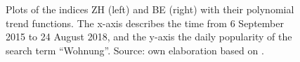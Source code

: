 \documentclass[11pt]{article}
\begin{document}
\begin{figure}[p!]
	\begin{minipage}{.5\linewidth}
		\centering
	\end{minipage}	\begin{minipage}{.5\linewidth}
		\centering
	\end{minipage}
	\caption{Plots of the indices ZH (left) and BE (right) with their polynomial trend functions. The x-axis describes the time from 6 September 2015 to 24 August 2018, and the y-axis the daily popularity of the search term ``Wohnung''. Source: own elaboration based on \cite{googleT}.}
	\label{fig:trend}
\end{figure}
\end{document}
